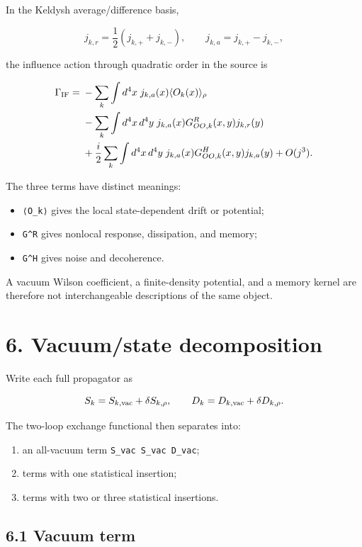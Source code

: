 \documentclass[
  10pt,
  a4paper,
]{article}
\providecommand{\tightlist}{%
  \setlength{\itemsep}{0pt}\setlength{\parskip}{0pt}}
\begin{document}
In the Keldysh average/difference basis,

\[
j_{k,r}=\frac12(j_{k,+}+j_{k,-}),
\qquad
j_{k,a}=j_{k,+}-j_{k,-},
\]

the influence action through quadratic order in the source is

\[
\begin{aligned}
\Gamma_{\rm IF}={}&
-\sum_k\int d^4x\;
 j_{k,a}(x)\langle O_k(x)\rangle_\rho
\\
&-\sum_k\int d^4x\,d^4y\;
 j_{k,a}(x)G^R_{OO,k}(x,y)j_{k,r}(y)
\\
&+\frac{i}{2}\sum_k\int d^4x\,d^4y\;
 j_{k,a}(x)G^H_{OO,k}(x,y)j_{k,a}(y)
+O(j^3).
\end{aligned}
\]

The three terms have distinct meanings:

\begin{itemize}
\tightlist
\item
  \texttt{⟨O\_k⟩} gives the local state-dependent drift or potential;
\item
  \texttt{G\^{}R} gives nonlocal response, dissipation, and memory;
\item
  \texttt{G\^{}H} gives noise and decoherence.
\end{itemize}

A vacuum Wilson coefficient, a finite-density potential, and a memory
kernel are therefore not interchangeable descriptions of the same
object.

\section{6. Vacuum/state decomposition}\label{vacuumstate-decomposition}

Write each full propagator as

\[
S_k=S_{k,{\rm vac}}+\delta S_{k,\rho},
\qquad
D_k=D_{k,{\rm vac}}+\delta D_{k,\rho}.
\]

The two-loop exchange functional then separates into:

\begin{enumerate}
\def\labelenumi{\arabic{enumi}.}
\tightlist
\item
  an all-vacuum term \texttt{S\_vac\ S\_vac\ D\_vac};
\item
  terms with one statistical insertion;
\item
  terms with two or three statistical insertions.
\end{enumerate}

\subsection{6.1 Vacuum term}\label{vacuum-term}
\end{document}
